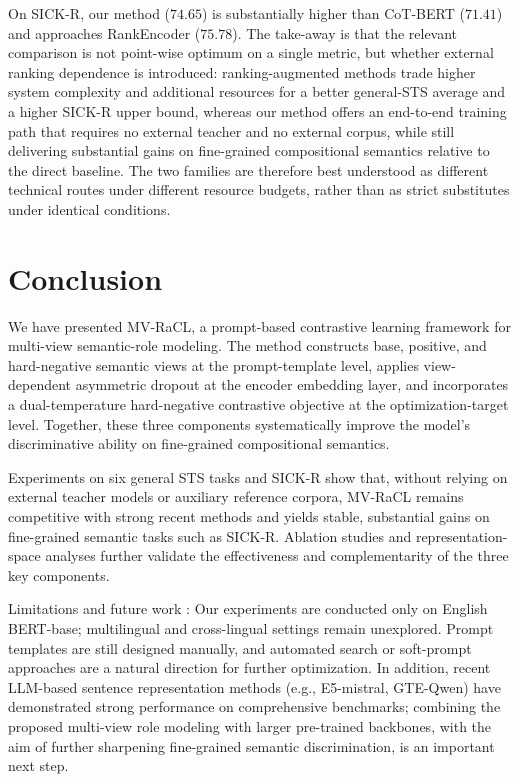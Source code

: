 \documentclass[a4paper,fleqn]{cas-dc}
\begin{document}
On SICK-R, our method ($74.65$) is substantially higher than CoT-BERT ($71.41$) and approaches RankEncoder ($75.78$). The take-away is that the relevant comparison is not point-wise optimum on a single metric, but whether external ranking dependence is introduced: ranking-augmented methods trade higher system complexity and additional resources for a better general-STS average and a higher SICK-R upper bound, whereas our method offers an end-to-end training path that requires no external teacher and no external corpus, while still delivering substantial gains on fine-grained compositional semantics relative to the direct baseline. The two families are therefore best understood as different technical routes under different resource budgets, rather than as strict substitutes under identical conditions.

\section{Conclusion}
\label{sec:conclusion}

We have presented MV-RaCL, a prompt-based contrastive learning framework for multi-view semantic-role modeling. The method constructs base, positive, and hard-negative semantic views at the prompt-template level, applies view-dependent asymmetric dropout at the encoder embedding layer, and incorporates a dual-temperature hard-negative contrastive objective at the optimization-target level. Together, these three components systematically improve the model's discriminative ability on fine-grained compositional semantics.

Experiments on six general STS tasks and SICK-R show that, without relying on external teacher models or auxiliary reference corpora, MV-RaCL remains competitive with strong recent methods and yields stable, substantial gains on fine-grained semantic tasks such as SICK-R. Ablation studies and representation-space analyses further validate the effectiveness and complementarity of the three key components.

Limitations and future work : Our experiments are conducted only on English BERT-base; multilingual and cross-lingual settings remain unexplored. Prompt templates are still designed manually, and automated search or soft-prompt approaches are a natural direction for further optimization. In addition, recent LLM-based sentence representation methods (e.g., E5-mistral, GTE-Qwen) have demonstrated strong performance on comprehensive benchmarks; combining the proposed multi-view role modeling with larger pre-trained backbones, with the aim of further sharpening fine-grained semantic discrimination, is an important next step.
\end{document}
